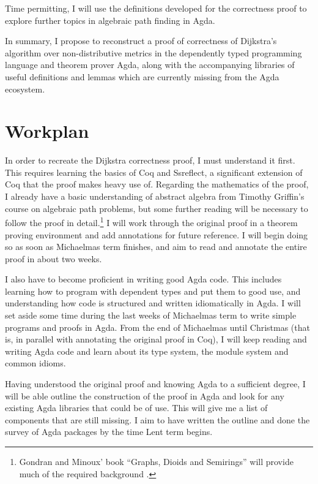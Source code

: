 \documentclass[a4paper]{scrartcl}
\begin{document}
Time permitting, I will use the definitions developed for the correctness proof to explore further topics in algebraic path finding in Agda.

In summary, I propose to reconstruct a proof of correctness of Dijkstra's algorithm over non-distributive metrics in the dependently typed programming language and theorem prover Agda, along with the accompanying libraries of useful definitions and lemmas which are currently missing from the Agda ecosystem.


\section{Workplan%
  \label{workplan}%
}

In order to recreate the Dijkstra correctness proof, I must understand it first. This requires learning the basics of Coq and Ssreflect, a significant extension of Coq that the proof makes heavy use of. Regarding the mathematics of the proof, I already have a basic understanding of abstract algebra from Timothy Griffin's course on algebraic path problems, but some further reading will be necessary to follow the proof in detail.\footnote{Gondran and Minoux' book \enquote{Graphs, Dioids and Semirings} will provide much of the required background \autocite{gondran_graphs_2008}.} I will work through the original proof in a theorem proving environment and add annotations for future reference. I will begin doing so as soon as Michaelmas term finishes, and aim to read and annotate the entire proof in about two weeks.

I also have to become proficient in writing good Agda code. This includes learning how to program with dependent types and put them to good use, and understanding how code is structured and written idiomatically in Agda. I will set aside some time during the last weeks of Michaelmas term to write simple programs and proofs in Agda. From the end of Michaelmas until Christmas (that is, in parallel with annotating the original proof in Coq), I will keep reading and writing Agda code and learn about its type system, the module system and common idioms.

Having understood the original proof and knowing Agda to a sufficient degree, I will be able outline the construction of the proof in Agda and look for any existing Agda libraries that could be of use. This will give me a list of components that are still missing. I aim to have written the outline and done the survey of Agda packages by the time Lent term begins.
\end{document}
